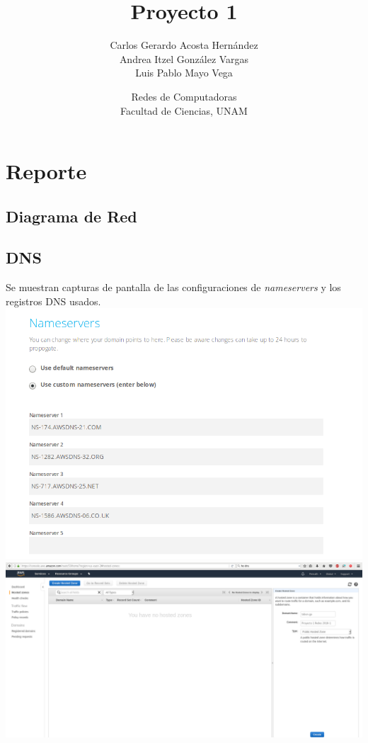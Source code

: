 \documentclass[9pt]{article}
\title{Proyecto 1}
\author{Carlos Gerardo Acosta Hernández \\ Andrea Itzel González Vargas \\ Luis Pablo Mayo Vega}
\date{Redes de Computadoras\\Facultad de Ciencias, UNAM}
\begin{document}
\maketitle

\section*{Reporte}

\subsection*{Diagrama de Red}

\subsection*{DNS}
Se muestran capturas de pantalla de las configuraciones de \textit{nameservers} y los registros \textsf{DNS} usados.\\
\includegraphics[width=\textwidth]{nameservers}
\includegraphics[width=\textwidth]{DNS_management}
\end{document}
